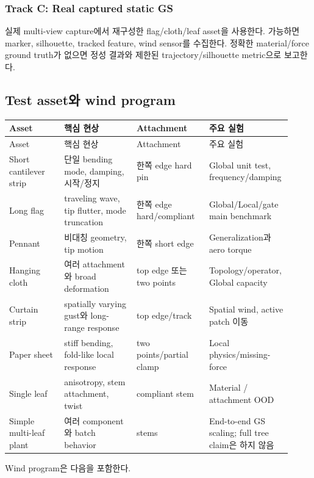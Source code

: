 \documentclass[11pt,a4paper]{article}
\begin{document}
\subsubsection{Track C: Real captured static GS}

실제 multi-view capture에서 재구성한 flag/cloth/leaf asset을 사용한다.
가능하면 marker, silhouette, tracked feature, wind sensor를 수집한다.
정확한 material/force ground truth가 없으면 정성 결과와 제한된 trajectory/silhouette metric으로 보고한다.

\subsection{Test asset와 wind program}

\begin{longtable}{L{0.19\linewidth}L{0.25\linewidth}L{0.25\linewidth}L{0.23\linewidth}}
\toprule
Asset & 핵심 현상 & Attachment & 주요 실험 \\
\midrule
\endfirsthead
\toprule
Asset & 핵심 현상 & Attachment & 주요 실험 \\
\midrule
\endhead
Short cantilever strip & 단일 bending mode, damping, 시작/정지 & 한쪽 edge hard pin & Global unit test, frequency/damping \\
\addlinespace
Long flag & traveling wave, tip flutter, mode truncation & 한쪽 edge hard/compliant & Global/Local/gate main benchmark \\
\addlinespace
Pennant & 비대칭 geometry, tip motion & 한쪽 short edge & Generalization과 aero torque \\
\addlinespace
Hanging cloth & 여러 attachment와 broad deformation & top edge 또는 two points & Topology/operator, Global capacity \\
\addlinespace
Curtain strip & spatially varying gust와 long-range response & top edge/track & Spatial wind, active patch 이동 \\
\addlinespace
Paper sheet & stiff bending, fold-like local response & two points/partial clamp & Local physics/missing-force \\
\addlinespace
Single leaf & anisotropy, stem attachment, twist & compliant stem & Material / attachment OOD \\
\addlinespace
Simple multi-leaf plant & 여러 component와 batch behavior & stems & End-to-end GS scaling; full tree claim은 하지 않음 \\
\bottomrule
\end{longtable}

Wind program은 다음을 포함한다.
\end{document}
